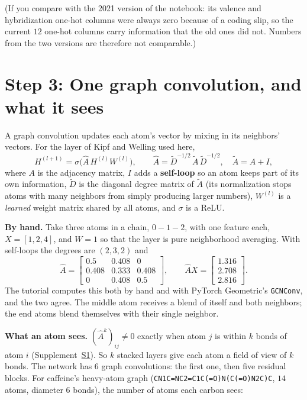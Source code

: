\documentclass[11pt]{article}
\newcommand{\Ah}{\hat{A}}
\newcommand{\At}{\tilde{A}}
\newcommand{\Dt}{\tilde{D}}
\begin{document}
(If you compare with the 2021 version of the notebook: its valence and hybridization one-hot columns were always zero because of a coding slip, so the current $12$ one-hot columns carry information that the old ones did not. Numbers from the two versions are therefore not comparable.)

\section{Step 3: One graph convolution, and what it sees}
A graph convolution updates each atom's vector by mixing in its neighbors' vectors. For the layer of Kipf and Welling used here,
\begin{equation}
  H^{(l+1)}=\sigma\!\Big(\Ah\,H^{(l)}W^{(l)}\Big),\qquad
  \Ah=\Dt^{-1/2}\,\At\,\Dt^{-1/2},\quad \At=A+I,
  \label{eq:gcn}
\end{equation}
where $A$ is the adjacency matrix, $I$ adds a \textbf{self-loop} so an atom keeps part of its own information, $\Dt$ is the diagonal degree matrix of $\At$ (its normalization stops atoms with many neighbors from simply producing larger numbers), $W^{(l)}$ is a \emph{learned} weight matrix shared by all atoms, and $\sigma$ is a ReLU.

\textbf{By hand.} Take three atoms in a chain, $0-1-2$, with one feature each, $X=[1,2,4]$, and $W=1$ so that the layer is pure neighborhood averaging. With self-loops the degrees are $(2,3,2)$ and
\[
  \Ah=\begin{bmatrix}0.5&0.408&0\\0.408&0.333&0.408\\0&0.408&0.5\end{bmatrix},\qquad
  \Ah X=\begin{bmatrix}1.316\\2.708\\2.816\end{bmatrix}.
\]
The tutorial computes this both by hand and with PyTorch Geometric's \texttt{GCNConv}, and the two agree. The middle atom receives a blend of itself and both neighbors; the end atoms blend themselves with their single neighbor.

\textbf{What an atom sees.} $(\Ah^k)_{ij}\neq0$ exactly when atom $j$ is within $k$ bonds of atom $i$ (Supplement~\hyperref[sec:S1]{S1}). So $k$ stacked layers give each atom a field of view of $k$ bonds. The network has $6$ graph convolutions: the first one, then five residual blocks. For caffeine's heavy-atom graph (\texttt{CN1C=NC2=C1C(=O)N(C(=O)N2C)C}, $14$ atoms, diameter $6$ bonds), the number of atoms each carbon sees:
\end{document}
